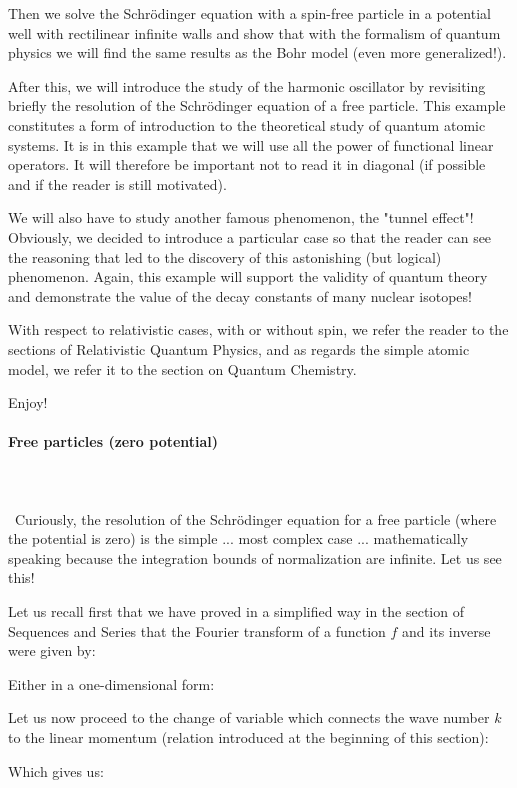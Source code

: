 	Then we solve the Schrödinger equation with a spin-free particle in a potential well with rectilinear infinite walls and show that with the formalism of quantum physics we will find the same results as the Bohr model (even more generalized!).

	After this, we will introduce the study of the harmonic oscillator by revisiting briefly the resolution of the Schrödinger equation of a free particle. This example constitutes a form of introduction to the theoretical study of quantum atomic systems. It is in this example that we will use all the power of functional linear operators. It will therefore be important not to read it in diagonal (if possible and if the reader is still motivated).

	We will also have to study another famous phenomenon, the "tunnel effect"! Obviously, we decided to introduce a particular case so that the reader can see the reasoning that led to the discovery of this astonishing (but logical) phenomenon. Again, this example will support the validity of quantum theory and demonstrate the value of the decay constants of many nuclear isotopes!

	With respect to relativistic cases, with or without spin, we refer the reader to the sections of Relativistic Quantum Physics, and as regards the simple atomic model, we refer it to the section on Quantum Chemistry.

	Enjoy!
	
	\paragraph{Free particles (zero potential)}\mbox{}\\\\\
	Curiously, the resolution of the Schrödinger equation for a free particle (where the potential is zero) is the simple ... most complex case ... mathematically speaking because the integration bounds of normalization are infinite. Let us see this!

Let us recall first that we have proved in a simplified way in the section of Sequences and Series that the Fourier transform of a function $f$ and its inverse were given by:
	
	Either in a one-dimensional form:
	
	Let us now proceed to the change of variable which connects the wave number $k$ to the linear momentum (relation introduced at the beginning of this section):
	
	Which gives us:
	
